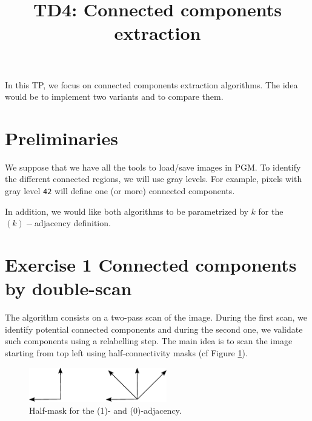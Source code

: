 \documentclass[a4paper, 11pt, french]{article}
\title{\bf{TD4: Connected components extraction}}
\author{}
\date{}
\begin{document}
\maketitle

\par In this TP, we focus on connected components extraction algorithms. The idea would be to implement two variants and to compare them. 


\section*{Preliminaries}

\par We suppose that we have all the tools to load/save images in PGM. To identify the different connected regions, we will use gray levels. For example, pixels with gray level \texttt{42} will define one (or more) connected components.

\par In addition, we would like both algorithms to be parametrized by $k$ for the $(k)-$adjacency definition.


\section*{Exercise 1 \rm Connected components by double-scan}


\par The algorithm consists on a two-pass scan of the image. During the first scan, we identify potential connected components and during the second one, we validate such components using a relabelling step. The main idea is to scan the image starting from top left using half-connectivity masks (cf Figure \ref{fig:masks}).

\begin{figure}
	\begin{center}
	\includegraphics[width=6cm]{masks}
	\caption{Half-mask for the (1)- and (0)-adjacency.\label{fig:masks}}
	\end{center}
\end{figure}
\end{document}
